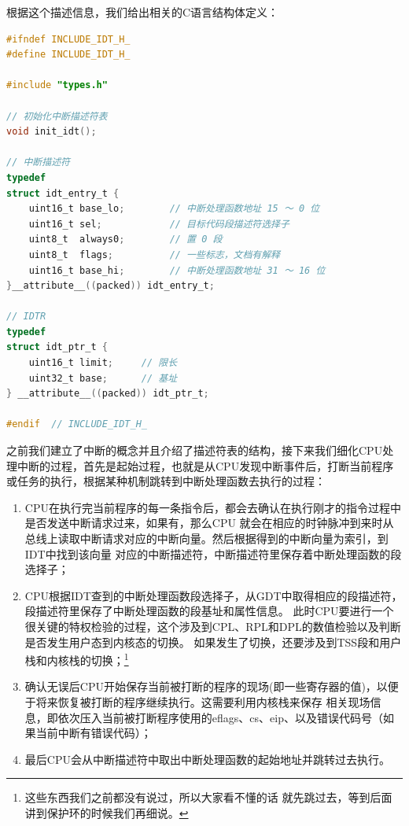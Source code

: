 \par 根据这个描述信息，我们给出相关的C语言结构体定义：

\begin{lstlisting}[language = C, caption = include/idt.h]
#ifndef INCLUDE_IDT_H_
#define INCLUDE_IDT_H_

#include "types.h"

// 初始化中断描述符表
void init_idt();

// 中断描述符
typedef
struct idt_entry_t {
	uint16_t base_lo;        // 中断处理函数地址 15 ～ 0 位
	uint16_t sel;            // 目标代码段描述符选择子
	uint8_t  always0;        // 置 0 段
	uint8_t  flags;          // 一些标志，文档有解释
	uint16_t base_hi;        // 中断处理函数地址 31 ～ 16 位
}__attribute__((packed)) idt_entry_t;

// IDTR
typedef
struct idt_ptr_t {
	uint16_t limit; 	// 限长
	uint32_t base; 		// 基址
} __attribute__((packed)) idt_ptr_t;

#endif 	// INCLUDE_IDT_H_
\end{lstlisting}

\par 之前我们建立了中断的概念并且介绍了描述符表的结构，接下来我们细化CPU处理中断的过程，首先是起始过程，也就是从CPU发现中断事件后，打断当前程序或任务的执行，根据某种机制跳转到中断处理函数去执行的过程：
\begin{enumerate}
	\item CPU在执行完当前程序的每一条指令后，都会去确认在执行刚才的指令过程中是否发送中断请求过来，如果有，那么CPU		就会在相应的时钟脉冲到来时从总线上读取中断请求对应的中断向量。然后根据得到的中断向量为索引，到IDT中找到该向量		对应的中断描述符，中断描述符里保存着中断处理函数的段选择子；
	\item CPU根据IDT查到的中断处理函数段选择子，从GDT中取得相应的段描述符，段描述符里保存了中断处理函数的段基址和属性信息。		此时CPU要进行一个很关键的特权检验的过程，这个涉及到CPL、RPL和DPL的数值检验以及判断是否发生用户态到内核态的切换。		如果发生了切换，还要涉及到TSS段和用户栈和内核栈的切换；\footnote{这些东西我们之前都没有说过，所以大家看不懂的话		就先跳过去，等到后面讲到保护环的时候我们再细说。}
	\item 确认无误后CPU开始保存当前被打断的程序的现场(即一些寄存器的值)，以便于将来恢复被打断的程序继续执行。这需要利用内核栈来保存		相关现场信息，即依次压入当前被打断程序使用的eflags、cs、eip、以及错误代码号（如果当前中断有错误代码）；
	\item 最后CPU会从中断描述符中取出中断处理函数的起始地址并跳转过去执行。
\end{enumerate}

